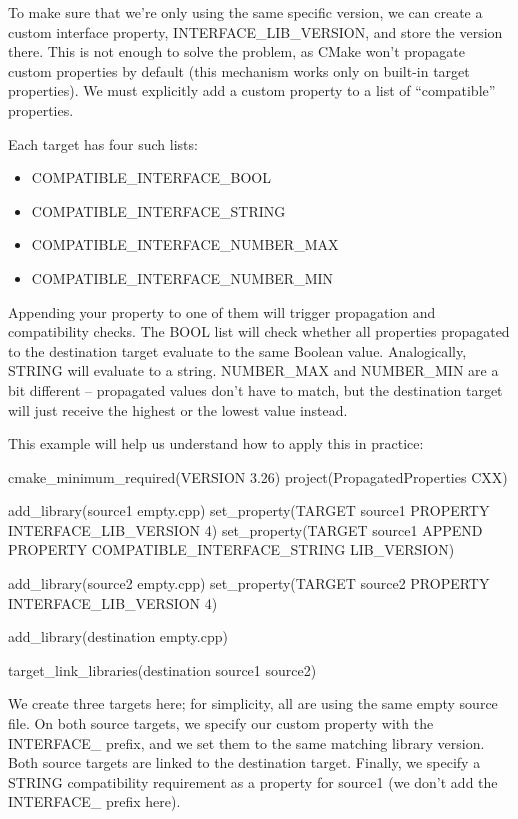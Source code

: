To make sure that we’re only using the same specific version, we can create a custom interface property, INTERFACE\_LIB\_VERSION, and store the version there. This is not enough to solve the problem, as CMake won’t propagate custom properties by default (this mechanism works only on built-in target properties). We must explicitly add a custom property to a list of “compatible” properties.

Each target has four such lists:

\begin{itemize}
\item
COMPATIBLE\_INTERFACE\_BOOL

\item
COMPATIBLE\_INTERFACE\_STRING

\item
COMPATIBLE\_INTERFACE\_NUMBER\_MAX

\item
COMPATIBLE\_INTERFACE\_NUMBER\_MIN
\end{itemize}

Appending your property to one of them will trigger propagation and compatibility checks. The BOOL list will check whether all properties propagated to the destination target evaluate to the same Boolean value. Analogically, STRING will evaluate to a string. NUMBER\_MAX and NUMBER\_MIN are a bit different – propagated values don’t have to match, but the destination target will just receive the highest or the lowest value instead.

This example will help us understand how to apply this in practice:


\begin{cmake}
cmake_minimum_required(VERSION 3.26)
project(PropagatedProperties CXX)

add_library(source1 empty.cpp)
set_property(TARGET source1 PROPERTY INTERFACE_LIB_VERSION 4)
set_property(TARGET source1 APPEND PROPERTY
             COMPATIBLE_INTERFACE_STRING LIB_VERSION)

add_library(source2 empty.cpp)
set_property(TARGET source2 PROPERTY INTERFACE_LIB_VERSION 4)

add_library(destination empty.cpp)

target_link_libraries(destination source1 source2)
\end{cmake}

We create three targets here; for simplicity, all are using the same empty source file. On both source targets, we specify our custom property with the INTERFACE\_ prefix, and we set them to the same matching library version. Both source targets are linked to the destination target. Finally, we specify a STRING compatibility requirement as a property for source1 (we don’t add the INTERFACE\_ prefix here).

